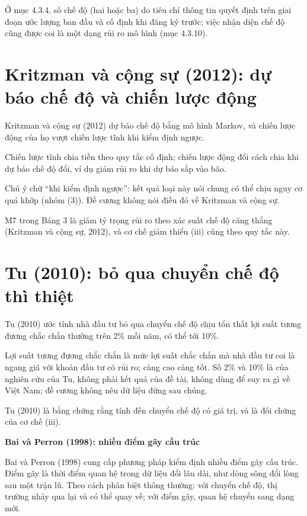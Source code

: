 Ở mục 4.3.4, số chế độ (hai hoặc ba) do tiêu chí thông tin quyết định trên giai đoạn ước lượng ban đầu và cố định khi đăng ký trước; việc nhận diện chế độ cũng được coi là một dạng rủi ro mô hình (mục 4.3.10).

\section{Kritzman và cộng sự (2012): dự báo chế độ và chiến lược động}

Kritzman và cộng sự (2012) dự báo chế độ bằng mô hình Markov, và chiến lược động của họ vượt chiến lược tĩnh khi kiểm định ngược.

Chiến lược tĩnh chia tiền theo quy tắc cố định; chiến lược động đổi cách chia khi dự báo chế độ đổi, ví dụ giảm rủi ro khi dự báo sắp vào bão.

Chú ý chữ “khi kiểm định ngược”: kết quả loại này nói chung có thể chịu nguy cơ quá khớp (nhóm (3)). Đề cương không nói điều đó về Kritzman và cộng sự.

M7 trong Bảng 3 là giảm tỷ trọng rủi ro theo xác suất chế độ căng thẳng (Kritzman và cộng sự, 2012), và cơ chế giảm thiểu (iii) cũng theo quy tắc này.

\section{Tu (2010): bỏ qua chuyển chế độ thì thiệt}

Tu (2010) ước tính nhà đầu tư bỏ qua chuyển chế độ chịu tổn thất lợi suất tương đương chắc chắn thường trên 2\% mỗi năm, có thể tới 10\%.

Lợi suất tương đương chắc chắn là mức lợi suất chắc chắn mà nhà đầu tư coi là ngang giá với khoản đầu tư có rủi ro; càng cao càng tốt. Số 2\% và 10\% là của nghiên cứu của Tu, không phải kết quả của đề tài, không dùng để suy ra gì về Việt Nam; đề cương không nêu dữ liệu đứng sau chúng.

Tu (2010) là bằng chứng rằng tính đến chuyển chế độ có giá trị, và là đối chứng của cơ chế (iii).

\textbf{Bai và Perron (1998): nhiều điểm gãy cấu trúc}

Bai và Perron (1998) cung cấp phương pháp kiểm định nhiều điểm gãy cấu trúc. Điểm gãy là thời điểm quan hệ trong dữ liệu đổi lâu dài, như dòng sông đổi lòng sau một trận lũ. Theo cách phân biệt thông thường: với chuyển chế độ, thị trường nhảy qua lại và có thể quay về; với điểm gãy, quan hệ chuyển sang dạng mới.

